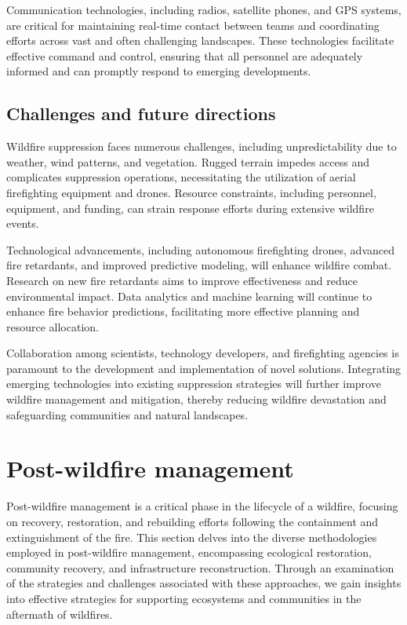 \documentclass[
  12 pt,
]{Nemilov}
\begin{document}
Communication technologies, including radios, satellite phones, and GPS systems, are critical for maintaining real-time contact between teams and coordinating efforts across vast and often challenging landscapes. These technologies facilitate effective command and control, ensuring that all personnel are adequately informed and can promptly respond to emerging developments.

\subsection{Challenges and future directions}\label{challenges-and-future-directions-1}

Wildfire suppression faces numerous challenges, including unpredictability due to weather, wind patterns, and vegetation. Rugged terrain impedes access and complicates suppression operations, necessitating the utilization of aerial firefighting equipment and drones. Resource constraints, including personnel, equipment, and funding, can strain response efforts during extensive wildfire events.

Technological advancements, including autonomous firefighting drones, advanced fire retardants, and improved predictive modeling, will enhance wildfire combat. Research on new fire retardants aims to improve effectiveness and reduce environmental impact. Data analytics and machine learning will continue to enhance fire behavior predictions, facilitating more effective planning and resource allocation.

Collaboration among scientists, technology developers, and firefighting agencies is paramount to the development and implementation of novel solutions. Integrating emerging technologies into existing suppression strategies will further improve wildfire management and mitigation, thereby reducing wildfire devastation and safeguarding communities and natural landscapes.

\section{Post-wildfire management}\label{post-wildfire-management}

Post-wildfire management is a critical phase in the lifecycle of a wildfire, focusing on recovery, restoration, and rebuilding efforts following the containment and extinguishment of the fire. This section delves into the diverse methodologies employed in post-wildfire management, encompassing ecological restoration, community recovery, and infrastructure reconstruction. Through an examination of the strategies and challenges associated with these approaches, we gain insights into effective strategies for supporting ecosystems and communities in the aftermath of wildfires.
\end{document}
